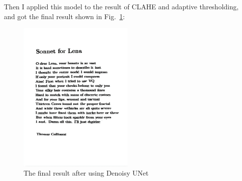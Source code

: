 \documentclass[12pt,a4paper]{article}
\begin{document}
\begin{enumerate}
    Then I applied this model to the result of CLAHE and adaptive thresholding, and got the final result shown in Fig.~\ref{fig:p4_final}:
    \begin{figure}[H]
        \centering
        \includegraphics[width=0.5\textwidth]{src/img/p4_final.png}
        \caption{The final result after using Denoisy UNet}
        \label{fig:p4_final}
    \end{figure}
    
    \end{enumerate}
\end{document}
